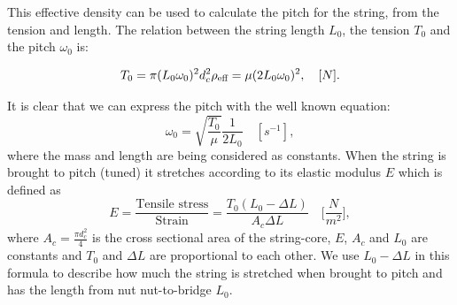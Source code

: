 \documentclass{article}
\begin{document}
\begin{sloppy}
This effective density can be used to calculate the pitch for the string, from the tension and length. The relation between the string length $L_0$, the tension $T_0$ and the pitch $\omega_0$ is:

\begin{equation}
    T_0 = \pi (L_0\omega_0)^2d_c^2\rho_{\textup{eff}} = \mu(2L_0\omega_0)^2, \quad [N].
\end{equation}

It is clear that we can express the pitch with the well known equation:
\begin{equation}
    \omega_0 = \sqrt{\frac{T_0}{\mu}} \frac{1}{2L_0} \quad [s^{-1}],
\end{equation}
where the mass and length are being considered as constants. 
When the string is brought to pitch (tuned) it stretches according to its elastic modulus $E$ which is defined as
%
\begin{equation}\label{eq:tensile_stress}
    E = \frac{\text{Tensile stress}}{\text{Strain}}
    = \frac{T_0 (L_0 - \Delta L)}{A_c \Delta L} \quad \bigg[\frac{N}{m^2}\bigg], 
\end{equation}
%
where $A_c = \frac{\pi d_c^2}{4}$ is the cross sectional area of the string-core, $E$, $A_c$ and $L_0$ are constants and $T_0$ and $\Delta L$ are proportional to each other. We use $L_0 - \Delta L$ in this formula to describe how much the string is stretched when brought to pitch and has the length from nut nut-to-bridge $L_0$.
%
%
%
%

\end{sloppy}
\end{document}
